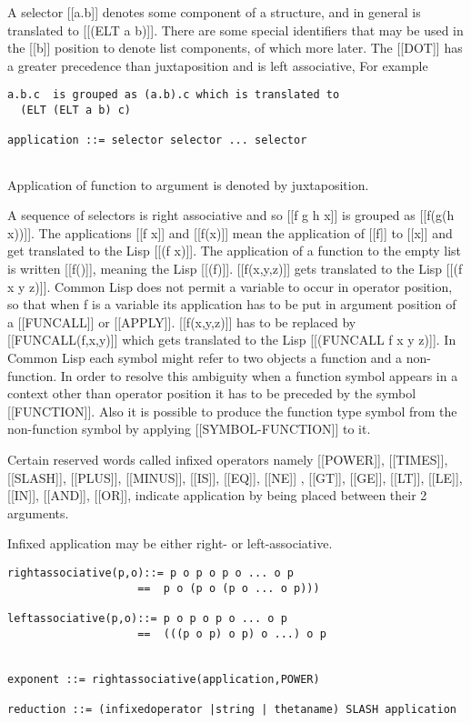 \documentclass{article}
\begin{document}
A selector [[a.b]] denotes some component of a structure, and in
general is translated to [[(ELT a b)]]. There are some special identifiers
that may be used in the [[b]] position to denote list components, of which
more later.
The [[DOT]] has a greater precedence than juxtaposition and is
left associative, For example
\begin{verbatim} 
a.b.c  is grouped as (a.b).c which is translated to
  (ELT (ELT a b) c)
 
application ::= selector selector ... selector
 
\end{verbatim} 

Application of function to argument is denoted by juxtaposition.
 
A sequence of selectors is right associative and so
[[f g h x]] is grouped as [[f(g(h x))]]. The applications [[f x]] and 
[[f(x)]]
mean the application of [[f]] to [[x]] and get translated to
the Lisp [[(f x)]]. The application of a function to the empty list
is written [[f()]], meaning the Lisp [[(f)]].  [[f(x,y,z)]] gets translated to
the Lisp [[(f x y z)]].
Common Lisp does not permit a variable to occur in operator position,
so that when f is a variable its application has to be
put in argument position of a [[FUNCALL]] or [[APPLY]].
[[f(x,y,z)]] has to be replaced by [[FUNCALL(f,x,y)]] which gets translated to
the Lisp [[(FUNCALL f x y z)]].
In Common Lisp each symbol might refer
to two objects a function and a non-function. In order to resolve
this ambiguity when a function symbol appears in a context other
than operator position it has to be preceded by the symbol [[FUNCTION]].
Also it is possible to produce the function type symbol from the
non-function symbol by applying [[SYMBOL-FUNCTION]] to it.
 
Certain reserved words called infixed operators namely
[[POWER]], [[TIMES]], [[SLASH]], [[PLUS]], [[MINUS]], [[IS]],
[[EQ]], [[NE]] , [[GT]], [[GE]], [[LT]], [[LE]], [[IN]], [[AND]], 
[[OR]], indicate application by being placed between their 2 arguments.
 
Infixed application may be either right- or left-associative.
\begin{verbatim}  
rightassociative(p,o)::= p o p o p o ... o p
                    ==  p o (p o (p o ... o p)))
 
leftassociative(p,o)::= p o p o p o ... o p
                    ==  (((p o p) o p) o ...) o p
 
 
exponent ::= rightassociative(application,POWER)
 
reduction ::= (infixedoperator |string | thetaname) SLASH application
\end{verbatim} 
\end{document}
